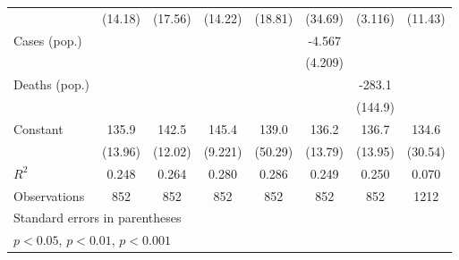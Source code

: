 \documentclass{article}
\begin{document}
{\begin{longtable}{l*{7}{c}}
                &  (14.18)         &  (17.56)         &  (14.22)         &  (18.81)         &  (34.69)         &  (3.116)         &  (11.43)         \\
Cases (pop.)    &                  &                  &                  &                  &   -4.567         &                  &                  \\
                &                  &                  &                  &                  &  (4.209)         &                  &                  \\
Deaths (pop.)   &                  &                  &                  &                  &                  &   -283.1         &                  \\
                &                  &                  &                  &                  &                  &  (144.9)         &                  \\
Constant        &    135.9\sym{***}&    142.5\sym{***}&    145.4\sym{***}&    139.0\sym{*}  &    136.2\sym{***}&    136.7\sym{***}&    134.6\sym{**} \\
                &  (13.96)         &  (12.02)         &  (9.221)         &  (50.29)         &  (13.79)         &  (13.95)         &  (30.54)         \\
\hline
\(R^{2}\)       &    0.248         &    0.264         &    0.280         &    0.286         &    0.249         &    0.250         &    0.070         \\
Observations    &      852         &      852         &      852         &      852         &      852         &      852         &     1212         \\
\hline\hline
\multicolumn{8}{l}{\footnotesize Standard errors in parentheses}\\
\multicolumn{8}{l}{\footnotesize \sym{*} \(p<0.05\), \sym{**} \(p<0.01\), \sym{***} \(p<0.001\)}\\
\end{longtable}
}
\end{document}
